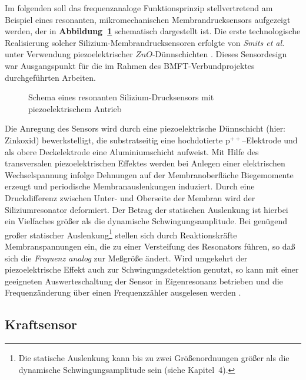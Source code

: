 Im folgenden soll das frequenzanaloge Funktionsprinzip stellvertretend
am Beispiel eines resonanten, mikromechanischen Membrandrucksensors
aufgezeigt werden, der in {\bf Abbildung~\ref{abbdrucksensor}}
schematisch dargestellt ist. Die erste technologische Realisierung
solcher Silizium-Membrandrucksensoren erfolgte von {\em Smits et al.}
unter Verwendung piezoelektrischer $ZnO$-Dünnschichten \cite{Smi83}.
Dieses Sensordesign war Ausgangspunkt für die im Rahmen des
BMFT-Verbundprojektes durchgeführten Arbeiten.
\begin{figure}[htb]
\begin{center}

\setdruckse
\end{center}
 \caption{\label{abbdrucksensor}
 Schema eines resonanten Silizium-Drucksensors mit piezoelektrischem Antrieb}
\end{figure}
Die Anregung des Sensors wird durch eine piezoelektrische Dünnschicht
(hier: Zinkoxid)
bewerkstelligt, die substratseitig eine hochdotierte p$^{++}$--Elektrode
und als obere Deckelektrode eine Aluminiumschicht aufweist.
Mit Hilfe des transversalen piezoelektrischen
Effektes werden bei Anlegen einer elektrischen Wechselspannung infolge
Dehnungen auf der Membranoberfläche Biegemomente erzeugt und perio\-dische
Membranauslenkungen induziert. Durch eine Druckdifferenz zwischen Unter-
und Oberseite der Membran wird der Siliziumresonator deformiert. Der Betrag
der statischen Auslenkung ist hierbei ein Vielfaches größer als die
dynamische Schwingungsamplitude. Bei genügend großer statischer
Auslenkung\footnote{Die statische Auslenkung kann bis zu zwei
Größenordnungen größer als die dynamische Schwingungsamplitude sein
(siehe Kapitel~4).} stellen sich durch Reaktionskräfte
Membranspannungen ein, die zu einer Versteifung des Resonators führen,
so daß sich die {\em Frequenz analog} zur Meßgröße ändert. Wird
umgekehrt der piezoelektrische Effekt auch zur Schwingungsdetektion
genutzt, so kann mit einer geeigneten Auswerteschaltung der Sensor in
Eigenresonanz betrieben und die Frequenzänderung über einen Frequenzzähler
ausgelesen werden \cite{Fun93}.


\subsection{Kraftsensor}
\label{kraftsensor}

